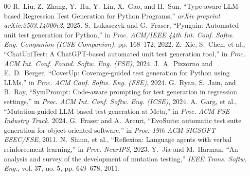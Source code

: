 \documentclass[conference]{IEEEtran}
\begin{document}
\begin{thebibliography}{00}
R.~Liu, Z.~Zhang, Y.~Hu, Y.~Lin, X.~Gao, and H.~Sun, ``Type-aware LLM-based Regression Test Generation for Python Programs,'' \emph{arXiv preprint arXiv:2503.14000v2}, 2025.
S.~Lukasczyk and G.~Fraser, ``Pynguin: Automated unit test generation for Python,'' in \emph{Proc. ACM/IEEE 44th Int. Conf. Softw. Eng. Companion (ICSE-Companion)}, pp. 168--172, 2022.
Z.~Xie, S.~Chen, et al., ``ChatUniTest: A ChatGPT-based automated unit test generation tool,'' in \emph{Proc. ACM Int. Conf. Found. Softw. Eng. (FSE)}, 2024.
J.~A.~Pizzorno and E.~D.~Berger, ``CoverUp: Coverage-guided test generation for Python using LLMs,'' in \emph{Proc. ACM Conf. Softw. Eng. (FSE)}, 2024.
G.~Ryan, S.~Jain, and B.~Ray, ``SymPrompt: Code-aware prompting for test generation in regression settings,'' in \emph{Proc. ACM Int. Conf. Softw. Eng. (ICSE)}, 2024.
A.~Garg, et al., ``Mutation-guided LLM-based test generation at Meta,'' in \emph{Proc. ACM FSE Industry Track}, 2024.
G.~Fraser and A.~Arcuri, ``EvoSuite: automatic test suite generation for object-oriented software,'' in \emph{Proc. 19th ACM SIGSOFT ESEC/FSE}, 2011.
N.~Shinn, et al., ``Reflexion: Language agents with verbal reinforcement learning,'' in \emph{Proc. NeurIPS}, 2023.
Y.~Jia and M.~Harman, ``An analysis and survey of the development of mutation testing,'' \emph{IEEE Trans. Softw. Eng.}, vol. 37, no. 5, pp. 649--678, 2011.
\end{thebibliography}
\end{document}
